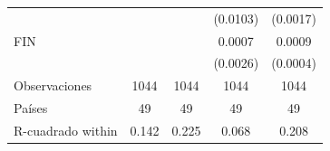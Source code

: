 {\begin{tabular}{l*{4}{c}}
                    &                     &                     &    (0.0103)         &    (0.0017)         \\
\addlinespace
FIN                 &                     &                     &      0.0007         &      0.0009\sym{**} \\
                    &                     &                     &    (0.0026)         &    (0.0004)         \\
\midrule
Observaciones       &        1044         &        1044         &        1044         &        1044         \\
Países              &          49         &          49         &          49         &          49         \\
R-cuadrado within   &       0.142         &       0.225         &       0.068         &       0.208         \\
\bottomrule
\end{tabular}
}
